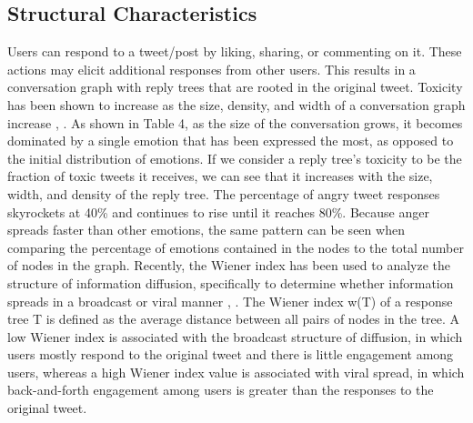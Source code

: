 \documentclass[acmtog]{acmart}
\begin{document}
\subsection{Structural Characteristics}
Users can respond to a tweet/post by liking, sharing, or commenting on it. These actions may elicit additional responses from other users. This results in a conversation graph with reply trees that are rooted in the original tweet. Toxicity has been shown to increase as the size, density, and width of a conversation graph increase \cite{kanavos2014conversation}, \cite{saveski2021structure}. As shown in Table 4, as the size of the conversation grows, it becomes dominated by a single emotion that has been expressed the most, as opposed to the initial distribution of emotions. If we consider a reply tree's toxicity to be the fraction of toxic tweets it receives, we can see that it increases with the size, width, and density of the reply tree. The percentage of angry tweet responses skyrockets at 40\% and continues to rise until it reaches 80\%. Because anger spreads faster than other emotions, the same pattern can be seen when comparing the percentage of emotions contained in the nodes to the total number of nodes in the graph. Recently, the Wiener index has been used to analyze the structure of information diffusion, specifically to determine whether information spreads in a broadcast or viral manner \cite{saveski2021structure}, \cite{goel2016structural}. The Wiener index w(T) of a response tree T is defined as the average distance between all pairs of nodes in the tree. A low Wiener index is associated with the broadcast structure of diffusion, in which users mostly respond to the original tweet and there is little engagement among users, whereas a high Wiener index value is associated with viral spread, in which back-and-forth engagement among users is greater than the responses to the original tweet. 
\end{document}

